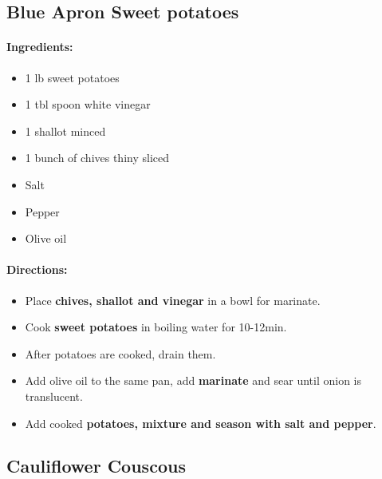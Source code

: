 \documentclass{article}
\begin{document}
\subsection{Blue Apron Sweet potatoes}

\paragraph{Ingredients:}

\begin{itemize}
	\item 1 lb sweet potatoes
	\item 1 tbl spoon white vinegar
	\item 1 shallot minced
	\item 1 bunch of chives thiny sliced
	\item Salt
	\item Pepper
	\item Olive oil
\end{itemize}

\paragraph{Directions:}
\begin{itemize}
	\item Place \textbf{chives, shallot and vinegar} in a bowl for marinate.
	\item Cook \textbf{sweet potatoes} in boiling water for 10-12min.
	\item After potatoes are cooked, drain them.
	\item Add olive oil to the same pan, add \textbf{marinate} and sear until onion is translucent.
	\item Add cooked \textbf{potatoes, mixture and season with salt and pepper}.
\end{itemize}






\subsection{Cauliflower Couscous}
\end{document}
